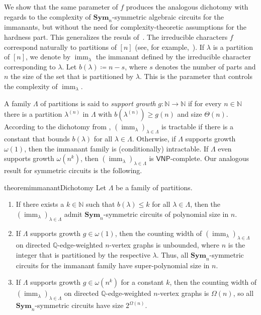\documentclass[10pt,a4paper]{article}
\theoremstyle{definition}
\theoremstyle{plain}
\theoremstyle{remark}
\newcommand{\Sym}{\mathbf{Sym}}
\newcommand{\bbN}{\mathbb{N}}
\newcommand{\bbQ}{\mathbb{Q}}
\DeclareMathOperator{\imm}{imm}
\newcommand{\VNP}{\mathsf{VNP}}
\begin{document}
We show that the same parameter of $f$ produces the analogous
dichotomy with regards to the complexity of $\Sym_n$-symmetric
algebraic circuits for the immanants, but without the need for
complexity-theoretic assumptions for the hardness part.  This
generalizes the resuls of~\cite{dawar_symmetric_2025}.
The irreducible characters $f$ correspond naturally to partitions
of $[n]$ (see, for example,~\cite[Prop.~1.10.1]{Sagan}).  If $\lambda$ is a partition of $[n]$, we denote by $\imm_{\lambda}$ the immanant defined by the irreducible character corresponding to $\lambda$.
Let $b(\lambda) \coloneqq n-s$, where $s$ denotes the number of parts and $n$ the size of the set that is partitioned by $\lambda$. This is the parameter that controls the complexity of $\imm_{\lambda}$.

A family $\Lambda$ of partitions is said to \emph{support growth} $g \colon \bbN \to \bbN$ if for every $n \in \bbN$ there is a partition $\lambda^{(n)}$ in $\Lambda$ with $b(\lambda^{(n)}) \geq g(n)$ and size $\Theta(n)$. According to the dichotomy from \cite{curticapean2021full}, $(\imm_{\lambda})_{\lambda \in \Lambda}$ is tractable if there is a constant that bounds $b(\lambda)$ for all $\lambda \in \Lambda$. Otherwise, if $\Lambda$ supports growth $\omega(1)$, then the immanant family is (conditionally) intractable. If $\Lambda$ even supports growth $\omega(n^k)$, then $(\imm_{\lambda})_{\lambda \in \Lambda}$ is $\VNP$-complete.
Our analogous result for symmetric circuits is the following.
\begin{restatable}{theorem}{immanantDichotomy}\label{thm:immanantDichotomy}
	Let $\Lambda$ be a family of partitions.
	\begin{enumerate}
		\item If there exists a $k \in \bbN$ such that $b(\lambda) \leq k$ for all $\lambda \in \Lambda$, then the $(\imm_{\lambda})_{\lambda \in \Lambda}$ admit $\Sym_n$-symmetric circuits of polynomial size in $n$.
		\item If $\Lambda$ supports growth $g \in \omega(1)$, then the counting width of $(\imm_{\lambda})_{\lambda \in \Lambda}$ on directed $\bbQ$-edge-weighted $n$-vertex graphs is unbounded, where $n$ is the integer that is partitioned by the respective $\lambda$.
		Thus, all $\Sym_n$-symmetric circuits for the immanant family have super-polynomial size in $n$. 
		\item If $\Lambda$ supports growth $g \in \omega(n^k)$ for a constant $k$, then the counting width of $(\imm_{\lambda})_{\lambda \in \Lambda}$ on directed $\bbQ$-edge-weighted $n$-vertex graphs is $\Omega(n)$, so all $\Sym_n$-symmetric circuits have size $2^{\Omega(n)}$.
	\end{enumerate}	
\end{restatable}	
	
\end{document}
